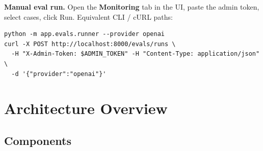 \documentclass[11pt,a4paper]{article}
\begin{document}
\textbf{Manual eval run.} Open the \textbf{Monitoring} tab in the UI, paste the admin
token, select cases, click Run. Equivalent CLI / cURL paths:
\begin{lstlisting}
python -m app.evals.runner --provider openai
curl -X POST http://localhost:8000/evals/runs \
  -H "X-Admin-Token: $ADMIN_TOKEN" -H "Content-Type: application/json" \
  -d '{"provider":"openai"}'
\end{lstlisting}

\section{Architecture Overview}

\subsection{Components}
\end{document}
